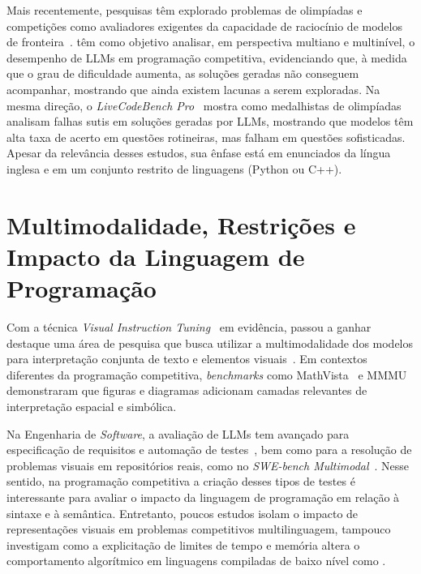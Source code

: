 Mais recentemente, pesquisas têm explorado problemas de olimpíadas e competições como avaliadores exigentes da capacidade de raciocínio de modelos de fronteira~\citep{huang2024competition,li2024evaluating,zheng2025livecodebench}. \citet{li2024evaluating} têm como objetivo analisar, em perspectiva multiano e multinível, o desempenho de LLMs em programação competitiva, evidenciando que, à medida que o grau de dificuldade aumenta, as soluções geradas não conseguem acompanhar, mostrando que ainda existem lacunas a serem exploradas. Na mesma direção, o \textit{LiveCodeBench Pro}~\citep{zheng2025livecodebench} mostra como medalhistas de olimpíadas analisam falhas sutis em soluções geradas por LLMs, mostrando que modelos têm alta taxa de acerto em questões rotineiras, mas falham em questões sofisticadas. Apesar da relevância desses estudos, sua ênfase está em enunciados da língua inglesa e em um conjunto restrito de linguagens (Python ou C++).

\section{Multimodalidade, Restrições e Impacto da Linguagem de Programação}\label{sec:rel-dimensoes}

Com a técnica \textit{Visual Instruction Tuning}~\citep{Liu2023VisualIT} em evidência, passou a ganhar destaque uma área de pesquisa que busca utilizar a multimodalidade dos modelos para interpretação conjunta de texto e elementos visuais~\citep{Fu2023MMEAC}. Em contextos diferentes da programação competitiva, \textit{benchmarks} como MathVista~\citep{Lu2023MathVistaEM} e MMMU~\citep{Yue2023MMMUAM} demonstraram que figuras e diagramas adicionam camadas relevantes de interpretação espacial e simbólica.

Na Engenharia de \textit{Software}, a avaliação de LLMs tem avançado para especificação de requisitos e automação de testes~\citep{Mendoza2024Comparative,Silva2025LLMs}, bem como para a resolução de problemas visuais em repositórios reais, como no \textit{SWE-bench Multimodal}~\citep{Yang2024SWEbenchMD}. Nesse sentido, na programação competitiva a criação desses tipos de testes é interessante para avaliar o impacto da linguagem de programação em relação à sintaxe e à semântica. Entretanto, poucos estudos isolam o impacto de representações visuais em problemas competitivos multilinguagem, tampouco investigam como a explicitação de limites de tempo e memória altera o comportamento algorítmico em linguagens compiladas de baixo nível como .

